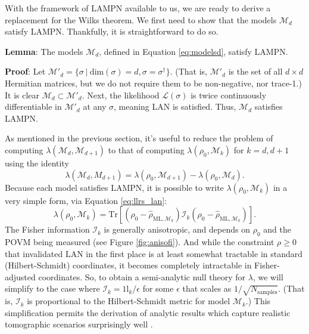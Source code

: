 \documentclass[aps,pra, twocolumn]{revtex4-1}
\newcommand{\M}{\mathcal{M}}
\newcommand{\cL}{\mathcal{L}}
\newcommand{\Id}{\mathbb{I}}
\def\Id{1\!\mathrm{l}}
\newcommand{\rhohat}{\hat{\rho}}
\newcommand{\rhoML}[1]{\rhohat_{\scriptscriptstyle{\mathrm{ML},#1}}}
\begin{document}
With the framework of LAMPN available to us, we are ready to derive a replacement for the Wilks theorem. We first need to show that the models $\M_{d}$ satisfy LAMPN. Thankfully, it is straightforward to do so.

\textbf{Lemma}: The models $\M_{d}$, defined in Equation \eqref{eq:modelsd}, satisfy LAMPN.

\textbf{Proof}: Let $\M'_{d} = \{\sigma ~|~\mathrm{dim}(\sigma) = d, \sigma = \sigma^{\dagger}\}$. (That is, $\M'_{d}$ is the set of all $d \times d$ Hermitian matrices, but we do not require them to be non-negative, nor trace-1.) It is clear $\M_{d} \subset \M'_{d}$. Next, the likelihood $\cL(\sigma)$ is twice continuously differentiable in $\M'_{d}$ at any $\sigma$, meaning LAN is satisfied. Thus, $\M_{d}$ satisfies LAMPN.

As mentioned in the previous section, it's useful to reduce the problem of computing $\lambda(\M_{d}, \M_{d+1})$ to that of computing $\lambda(\rho_{0}, \M_{k})$ for $k = d, d+1$ using the identity
\[\lambda(\M_{d}, M_{d+1}) = \lambda(\rho_{0}, \M_{d+1}) - \lambda(\rho_{0}, \M_{d}).\]
Because each model satisfies LAMPN, it is possible to write $\lambda(\rho_{0}, \M_{k})$ in a very simple form, via Equation \eqref{eq:llrs_lan}:
\[\lambda(\rho_{0}, \M_{k}) = \mathrm{Tr}[(\rho_{0} - \rhoML{\M_{k}})\mathcal{I}_{k}(\rho_{0} - \rhoML{\M_{k}})].\]
The Fisher information $\mathcal{I}_{k}$ is generally anisotropic, and depends on $\rho_{0}$ and the POVM being measured (see Figure \ref{fig:anisofi}). And while the constraint $\rho\geq0$ that invalidated LAN in the first place is at least somewhat tractable in standard (Hilbert-Schmidt) coordinates, it becomes completely intractable in Fisher-adjusted coordinates.  So, to obtain a semi-analytic null theory for $\lambda$, we will simplify to the case where   $\mathcal{I}_{k} = \Id_{k}/\epsilon $ for some $\epsilon$ that scales as $1/\sqrt{N_{\mathrm{samples}}}$. (That is, $\mathcal{I}_{k}$ is proportional to the Hilbert-Schmidt metric for model $\M_{k}$.) This simplification permits the derivation of analytic results which capture realistic tomographic scenarios surprisingly well \cite{Smolin2012}.
\end{document}
